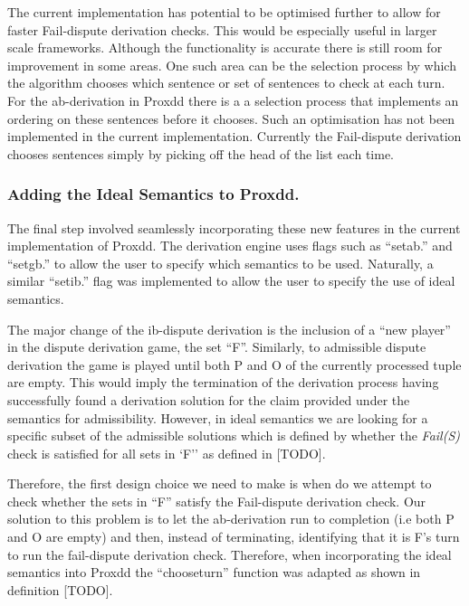 The current implementation has potential to be optimised further to allow for faster Fail-dispute derivation checks. This would be especially useful in larger scale frameworks. Although the functionality is accurate there is still room for improvement in some areas. One such area can be the selection process by which the algorithm chooses which sentence or set of sentences to check at each turn. For the ab-derivation in Proxdd there is a a selection process that implements an ordering on these sentences before it chooses. Such an optimisation has not been implemented in the current implementation. Currently the Fail-dispute derivation chooses sentences simply by picking off the head of the list each time.


\subsubsection{Adding the Ideal Semantics to Proxdd.}

The final step involved seamlessly incorporating these new features in the current implementation of Proxdd. The derivation engine uses flags such as ``set\textunderscore ab.'' and ``set\textunderscore gb.'' to allow the user to specify which semantics to be used. Naturally, a similar ``set\textunderscore ib.'' flag was implemented to allow the user to specify the use of ideal semantics.

The major change of the ib-dispute derivation is the inclusion of a ``new player'' in the dispute derivation game, the set ``F''. Similarly, to admissible dispute derivation the game is played until both P and O of the currently processed tuple are empty. This would imply the termination of the derivation process having successfully found a derivation solution for the claim provided under the semantics for admissibility. However, in ideal semantics we are looking for a specific subset of the admissible solutions which is defined by whether the \emph{Fail(S)} check is satisfied for all sets in `F'' as defined in [TODO].

Therefore, the first design choice we need to make is when do we attempt to check whether the sets in ``F'' satisfy the Fail-dispute derivation check. Our solution to this problem is to let the ab-derivation run to completion (i.e both P and O are empty) and then, instead of terminating, identifying that it is F's turn to run the fail-dispute derivation check. Therefore, when incorporating the ideal semantics into Proxdd the ``choose\textunderscore turn'' function was adapted as shown in definition [TODO].

